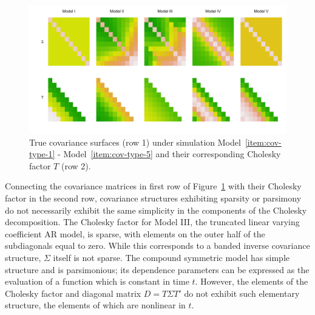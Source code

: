 %
\begin{figure}[H] \label{fig:true-covariance-heatmaps}
\centering
  \includegraphics[width = \textwidth]{img/chapter-4/cov-cholesky-grid}
\caption{True covariance surfaces (row 1) under simulation Model~\ref{item:cov-type-1} - Model~\ref{item:cov-type-5} and their corresponding Cholesky factor $T$ (row 2).}
\end{figure}


\bigskip

Connecting the covariance matrices in first row of Figure~\ref{fig:true-covariance-heatmaps} with their Cholesky factor in the second row, covariance structures exhibiting sparsity or parsimony do not necessarily exhibit the same simplicity in the components of the Cholesky decomposition. The Cholesky factor for Model III, the truncated linear varying coefficient AR model, is sparse, with elements on the outer half of the subdiagonals equal to zero. While this corresponds to a banded inverse covariance structure, $\Sigma$ itself is not sparse.  The compound symmetric model has simple structure and is parsimonious; its dependence parameters can be expressed as the evaluation of a function which is constant in time $t$. However, the elements of the Cholesky factor and diagonal matrix $D = T \Sigma T'$ do not exhibit such elementary structure, the elements of which are nonlinear in $t$. 

\bigskip

%


